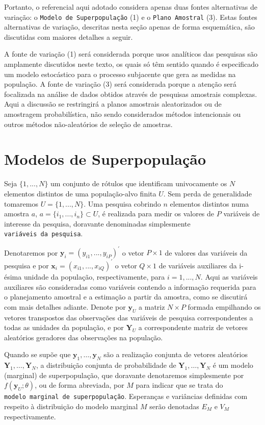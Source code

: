 \documentclass[]{book}
\theoremstyle{definition}
\theoremstyle{definition}
\theoremstyle{definition}
\theoremstyle{remark}
\begin{document}
Portanto, o referencial aqui adotado considera apenas duas fontes
alternativas de variação: o \texttt{Modelo\ de\ Superpopulação} (1) e o
\texttt{Plano\ Amostral} (3). Estas fontes alternativas de variação,
descritas nesta seção apenas de forma esquemática, são discutidas com
maiores detalhes a seguir.

A fonte de variação (1) será considerada porque usos analíticos das
pesquisas são amplamente discutidos neste texto, os quais só têm sentido
quando é especificado um modelo estocástico para o processo subjacente
que gera as medidas na população. A fonte de variação (3) será
considerada porque a atenção será focalizada na análise de dados obtidos
através de pesquisas amostrais complexas. Aqui a discussão se
restringirá a planos amostrais aleatorizados ou de amostragem
probabilística, não sendo considerados métodos intencionais ou outros
métodos não-aleatórios de seleção de amostras.

\section{Modelos de Superpopulação}\label{modelos-de-superpopulacao}

Seja \(\{1, ..., N\}\) um conjunto de rótulos que identificam
univocamente os \(N\) elementos distintos de uma população-alvo finita
\(U\). Sem perda de generalidade tomaremos \(U=\{1,...,N\}\). Uma
pesquisa cobrindo \(n\) elementos distintos numa amostra \(a\),
\(a=\{i_{1},...,i_{n}\}\subset U\), é realizada para medir os valores de
\(P\) variáveis de interesse da pesquisa, doravante denominadas
simplesmente \texttt{variáveis\ da\ pesquisa}.

Denotaremos por \(\mathbf{y}_i=(y_{i1},...,y_{iP})^{\prime }\) o vetor
\(P\times 1\) de valores das variáveis da pesquisa e por
\(\mathbf{x}_{i}=(x_{i1},...,x_{iQ})^{\prime }\) o vetor \(Q\times 1\)
de variáveis auxiliares da i-ésima unidade da população,
respectivamente, para \(i=1,...,N\). Aqui as variáveis auxiliares são
consideradas como variáveis contendo a informação requerida para o
planejamento amostral e a estimação a partir da amostra, como se
discutirá com mais detalhes adiante. Denote por \(\mathbf{y}_{U}\) a
matriz \(N \times P\) formada empilhando os vetores transpostos das
observações das variáveis de pesquisa correspondentes a todas as
unidades da população, e por \(\mathbf{Y}_{U}\) a correspondente matriz
de vetores aleatórios geradores das observações na população.

Quando se supõe que \(\mathbf{y}_1 ,\ldots, \mathbf{y}_N\) são a
realização conjunta de vetores aleatórios
\(\mathbf{Y}_1 ,\ldots, \mathbf{Y}_N\), a distribuição conjunta de
probabilidade de \(\mathbf{Y}_1 ,\ldots, \mathbf{Y}_N\) é um modelo
(marginal) de superpopulação, que doravante denotaremos simplesmente por
\(f(\mathbf{y}_U;\theta)\), ou de forma abreviada, por \(M\) para
indicar que se trata do \texttt{modelo\ marginal\ de\ superpopulação}.
Esperanças e variâncias definidas com respeito à distribuição do modelo
marginal \(M\) serão denotadas \(E_M\) e \(V_M\) respectivamente.
\end{document}
